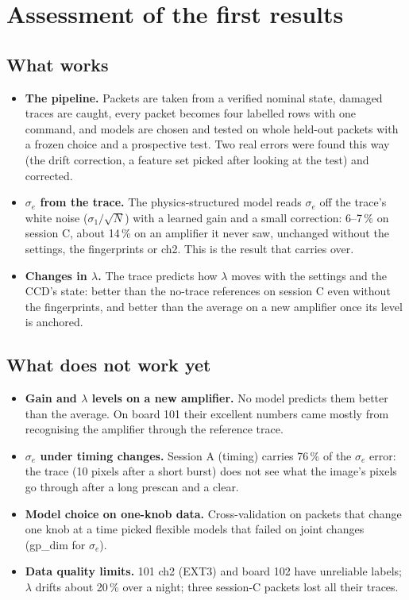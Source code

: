 \documentclass[11pt]{article}
\begin{document}
\section{Assessment of the first results}

\subsection{What works}
\begin{itemize}
\item \textbf{The pipeline.} Packets are taken from a verified nominal state, damaged traces are caught, every packet
  becomes four labelled rows with one command, and models are chosen and tested on whole held-out packets with a frozen
  choice and a prospective test. Two real errors were found this way (the drift correction, a feature set picked after
  looking at the test) and corrected.
\item \textbf{$\sigma_e$ from the trace.} The physics-structured model reads $\sigma_e$ off the trace's white noise
  ($\sigma_1/\sqrt N$) with a learned gain and a small correction: 6--7\,\% on session C, about 14\,\% on an amplifier it
  never saw, unchanged without the settings, the fingerprints or ch2. This is the result that carries over.
\item \textbf{Changes in $\lambda$.} The trace predicts how $\lambda$ moves with the settings and the CCD's state:
  better than the no-trace references on session C even without the fingerprints, and better than the average on a new
  amplifier once its level is anchored.
\end{itemize}

\subsection{What does not work yet}
\begin{itemize}
\item \textbf{Gain and $\lambda$ levels on a new amplifier.} No model predicts them better than the average. On board
  101 their excellent numbers came mostly from recognising the amplifier through the reference trace.
\item \textbf{$\sigma_e$ under timing changes.} Session A (timing) carries 76\,\% of the $\sigma_e$ error: the trace
  (10 pixels after a short burst) does not see what the image's pixels go through after a long prescan and a clear.
\item \textbf{Model choice on one-knob data.} Cross-validation on packets that change one knob at a time picked flexible
  models that failed on joint changes (gp\_dim for $\sigma_e$).
\item \textbf{Data quality limits.} 101 ch2 (EXT3) and board 102 have unreliable labels; $\lambda$ drifts about 20\,\%
  over a night; three session-C packets lost all their traces.
\end{itemize}
\end{document}
